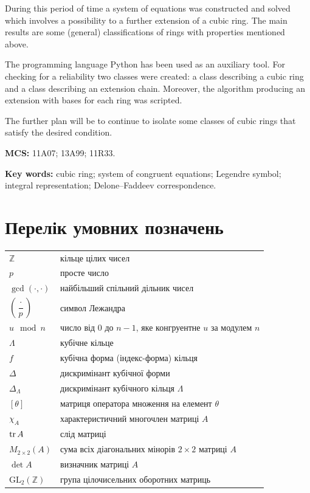 \documentclass{thesis}
\begin{document}
During this period of time a system of equations was constructed and solved which involves a possibility to a further extension of a cubic ring. The main results are some (general) classifications of rings with properties mentioned above.

The programming language Python has been used as an auxiliary tool. For checking for a reliability two classes were created: a class describing a cubic ring and a class describing an extension chain. Moreover, the algorithm producing an extension with bases for each ring was scripted.

The further plan will be to continue to isolate some classes of cubic rings that satisfy the desired condition.

\bigskip

\noindent
{\bf MCS:} 11A07; 13A99; 11R33. %


\bigskip

\noindent
{\bf Key words:} cubic ring; system of congruent equations; Legendre symbol; integral representation; Delone--Faddeev correspondence.

\newpage

\tableofcontents

\newpage

\section*{Перелік умовних позначень}

\bigskip


\begin{tabular}{ll}
$\mathbb{Z}$ & кільце цілих чисел\\
$p$ & просте число\\
$\gcd(\cdot,\cdot)$ & найбільший спільний дільник чисел\\
$\left( \dfrac{\cdot}{p} \right)$ & символ Лежандра\\
$u \mod n$ & число від $0$ до $n-1$, яке конгруентне $u$ за модулем $n$\\
$\Lambda$ & кубічне кільце\\
$f$ & кубічна форма (індекс-форма) кільця\\
$\Delta$ & дискримінант кубічної форми\\
$\Delta_\Lambda$ & дискримінант кубічного кільця $\Lambda$\\
$[\theta]$ & матриця оператора множення на елемент $\theta$\\
$\chi_A$ & характеристичний многочлен матриці $A$\\
$\operatorname{tr} A$ & слід матриці\\
$M_{2 \times 2}(A)$ & сума всіх діагональних мінорів $2 \times 2$ матриці $A$\\
$\det A$ & визначник матриці $A$\\
$\mathrm{GL}_2(\mathbb{Z})$ & група цілочисельних оборотних матриць\\
\end{tabular}
\end{document}
